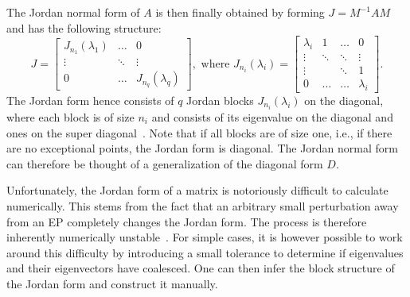 \documentclass[../main.tex]{subfiles}
\begin{document}
The Jordan normal form of $A$ is then finally obtained by forming $J = M^{-1}AM$ and has the following structure: 
\begin{equation}\label{eq:jordan}
    J = \begin{bmatrix}J_{n_1}(\lambda_1) & \dots & 0 \\
                            \vdots & \ddots & \vdots \\
                        0 & \dots &  J_{n_q}(\lambda_q)\end{bmatrix}, \text{ where }
       J_{n_i}(\lambda_i) = \begin{bmatrix} \lambda_i & 1 & \dots & 0 \\
                                                    \vdots  & \ddots & \ddots & \vdots \\
                                                    \vdots & & \ddots& 1 \\
                                                    0 & \dots & \dots & \lambda_i\end{bmatrix}.
\end{equation}
The Jordan form hence consists of $q$ Jordan blocks $J_{n_i}(\lambda_i)$ on the diagonal, where each block is of size $n_i$ and consists of its eigenvalue on the diagonal and ones on the super diagonal~\cite{uffe}. Note that if all blocks are of size one, i.e., if there are no exceptional points, the Jordan form is diagonal. The Jordan normal form can therefore be thought of a generalization of the diagonal form $D$.


Unfortunately, the Jordan form of a matrix is notoriously difficult to calculate numerically. This stems from the fact that an arbitrary small perturbation away from an EP completely changes the Jordan form. The process is therefore inherently numerically unstable~\cite{horn}. For simple cases, it is however possible to work around this difficulty by introducing a small tolerance to determine if eigenvalues and their eigenvectors have coalesced. One can then infer the block structure of the Jordan form and construct it manually.
\end{document}
